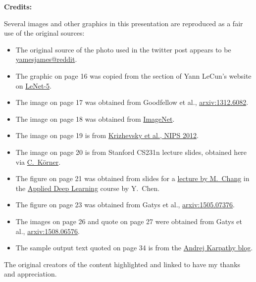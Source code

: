 \documentclass[12pt,t]{beamer}
\begin{document}
{\bf Credits:} \\
{\scriptsize
Several images and other graphics  in this presentation are reproduced as a fair use of the original sources:
\begin{itemize}
\item The original source of the photo used in the twitter post appears to be \href{https://www.reddit.com/r/aww/comments/59zz7g/my_friends_new_pup_kuma/}{\color{blue} yamesjames@reddit}.
\item The graphic on page 16 was copied from the section of Yann LeCun's website on \href{http://yann.lecun.com/exdb/lenet/index.html}{\color{blue}LeNet-5}.
\item The image on page 17 was obtained from Goodfellow et al., \href{https://arxiv.org/abs/1312.6082}{\color{blue} arxiv:1312.6082}.
\item The image on page 18 was obtained from \href{http://www.image-net.org}{\color{blue} ImageNet}.
\item The image on page 19 is from \href{https://www.cs.toronto.edu/~kriz/imagenet_classification_with_deep_convolutional.pdf}{\color{blue} Krizhevsky et al., NIPS 2012}.
\item The image on page 20 is from Stanford CS231n  lecture slides, obtained here via \href{https://chaosmail.github.io/deeplearning/2016/10/22/intro-to-deep-learning-for-computer-vision/}{\color{blue} C.\ K\"orner}.
\item The figure on page 21 was obtained from slides for a \href{https://www.csie.ntu.edu.tw/~yvchen/f105-adl/doc/161103_ConvolutionalNN.pdf}{\color{blue} lecture by M.\ Chang} in the  \href{https://www.csie.ntu.edu.tw/~yvchen/f105-adl/index.html}{\color{blue} Applied Deep Learning} course by Y.\ Chen.
\item The figure on page 23 was obtained from Gatys et al., \href{https://arxiv.org/abs/1505.07376}{\color{blue}arxiv:1505.07376}.
\item The images on page 26 and quote on page 27 were obtained from Gatys et al., \href{https://arxiv.org/abs/1508.06576}{\color{blue}arxiv:1508.06576}.
\item The sample output text quoted on page 34 is from the \href{http://karpathy.github.io/2015/05/21/rnn-effectiveness/}{\color{blue}Andrej Karpathy blog}.
\end{itemize}
The original creators of the content highlighted and linked to have my thanks and appreciation. }

\end{document}
